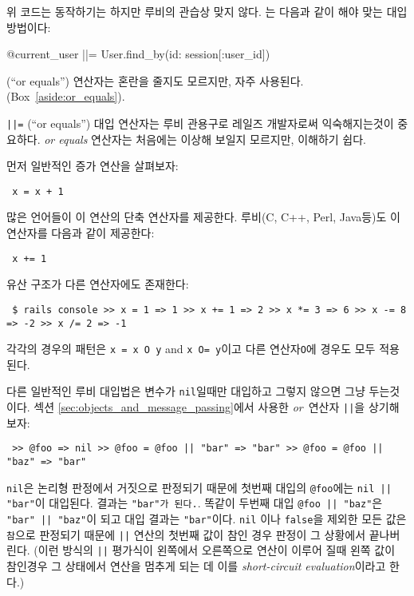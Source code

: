 위 코드는 동작하기는 하지만 루비의 관습상 맞지 않다. 는 다음과 같이 해야 맞는 대입 방법이다: 

\begin{code} @current_user ||= User.find_by(id: session[:user_id]) \end{code} 

\noindent \kode{||=} (``or equals'') 연산자는 혼란을 줄지도 모르지만, 자주 사용된다. (Box~\ref{aside:or_equals}). 

\begin{aside} \label{aside:or_equals}  

\texttt{||=} (``or equals'') 대입 연산자는 루비 관용구로 레일즈 개발자로써 익숙해지는것이 중요하다. \emph{or equals} 연산자는 처음에는 이상해 보일지 모르지만, 이해하기 쉽다. 

먼저 일반적인 증가 연산을 살펴보자: 

\begin{verbatim} x = x + 1 \end{verbatim} 

\noindent 많은 언어들이 이 연산의 단축 연산자를 제공한다. 루비(C, C++, Perl, Java등)도 이 연산자를 다음과 같이 제공한다: 

\begin{verbatim} x += 1 \end{verbatim} 

\noindent 유산 구조가 다른 연산자에도 존재한다: 

\begin{verbatim} $ rails console >> x = 1 => 1 >> x += 1 => 2 >> x *= 3 => 6 >> x -= 8 => -2 >> x /= 2 => -1 \end{verbatim} 

\noindent 각각의 경우의 패턴은 \texttt{x = x O y} and \texttt{x O= y}이고 다른 연산자\texttt{O}에 경우도 모두 적용된다. 

다른 일반적인 루비 대입법은 변수가 \texttt{nil}일때만 대입하고 그렇지 않으면 그냥 두는것이다. 섹션 \ref{sec:objects_and_message_passing}에서 사용한 \emph{or}~연산자 \texttt{||}을 상기해보자: 

\begin{verbatim} >> @foo => nil >> @foo = @foo || "bar" => "bar" >> @foo = @foo || "baz" => "bar" \end{verbatim} 

\noindent \texttt{nil}은 논리형 판정에서 거짓으로 판정되기 때문에 첫번째 대입의 \texttt{@foo}에는 \texttt{nil || "bar"}이 대입된다. 결과는 \texttt{"bar"가 된다.}. 똑같이 두번째 대입 \texttt{@foo || "baz"}은 \texttt{"bar" || "baz"}이 되고 대입 결과는 \texttt{"bar"}이다. \texttt{nil} 이나 \texttt{false}을 제외한 모든 값은 \texttt{참}으로 판정되기 때문에 \texttt{||} 연산의 첫번째 값이 참인 경우 판정이 그 상황에서 끝나버린다. (이런 방식의 \texttt{||} 평가식이 왼쪽에서 오른쪽으로 연산이 이루어 질때 왼쪽 값이 참인경우 그 상태에서 연산을 멈추게 되는 데 이를 \emph{short-circuit evaluation}이라고 한다.) 


\end{aside}
